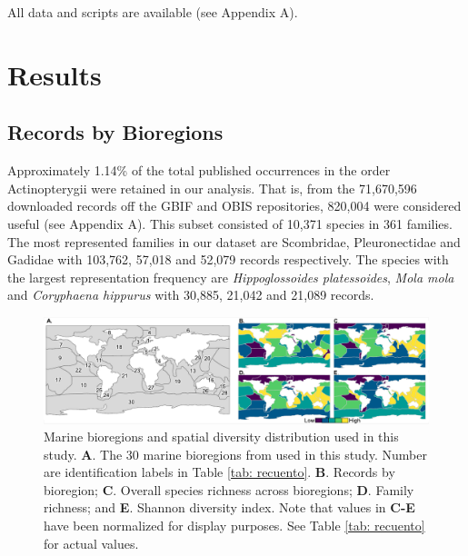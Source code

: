 \documentclass[12pt,authoryear]{elsarticle}
\begin{document}
All data and scripts are available (see Appendix A).


 \section{Results}

\subsection{Records by Bioregions}
\label{sec:cleaned-data}

Approximately 1.14\% of the total published occurrences in the order Actinopterygii were retained in our analysis. That is, from the 71,670,596 downloaded records off the GBIF and OBIS repositories, 820,004 were considered useful (see Appendix A). This subset consisted of 10,371 species in 361 families. The most represented families in our dataset are Scombridae, Pleuronectidae and Gadidae with 103,762, 57,018 and 52,079 records respectively. The species with the largest representation frequency are \textit{Hippoglossoides platessoides}, \textit{Mola mola} and \textit{Coryphaena hippurus} with 30,885, 21,042 and 21,089 records. 

\begin{figure}
  \centering
  \includegraphics[width=\textwidth]{Fig_1}
   \caption{Marine bioregions and spatial diversity distribution used in this study.  \textsf{ \textbf{A}}. The 30 marine bioregions from \cite{costello2017marine} used in this study. Number are identification labels in Table \ref{tab: recuento}. \textsf{\textbf{B}}. Records by bioregion; \textsf{\textbf{C}}. Overall species richness across bioregions; \textsf{\textbf{D}}. Family richness; and \textsf{\textbf{E}}. Shannon diversity index. Note that values in \textbf{C-E} have been normalized for display purposes. See Table  \ref{tab: recuento} for actual values. }
    \label{fig:Data}
\end{figure}
\end{document}
